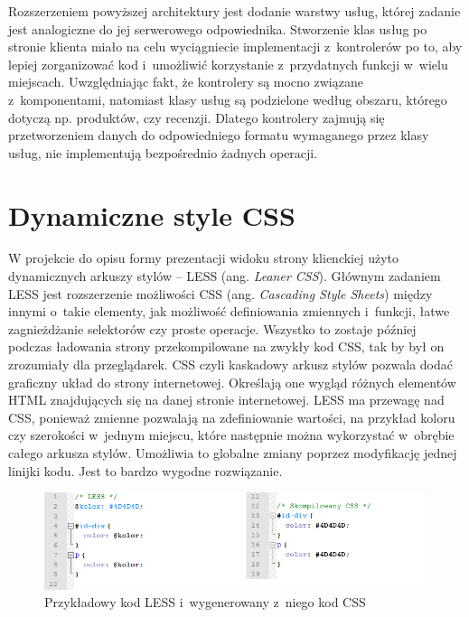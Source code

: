 Rozszerzeniem powyższej architektury jest dodanie warstwy usług, której zadanie jest analogiczne do jej serwerowego odpowiednika. Stworzenie klas usług po stronie klienta miało na celu wyciągniecie implementacji z~kontrolerów po to, aby lepiej zorganizować kod i~umożliwić korzystanie z~przydatnych funkcji w~wielu miejscach. Uwzględniając fakt, że kontrolery są mocno związane z~komponentami, natomiast klasy usług są podzielone według obszaru, którego dotyczą np. produktów, czy recenzji. Dlatego kontrolery zajmują się przetworzeniem danych do odpowiedniego formatu wymaganego przez klasy usług, nie implementują bezpośrednio żadnych operacji.



\section{Dynamiczne style CSS}
W projekcie do opisu formy prezentacji widoku strony klienckiej użyto dynamicznych arkuszy stylów – LESS (ang. \textit{Leaner CSS}). Głównym zadaniem LESS jest rozszerzenie możliwości CSS (ang. \textit{Cascading Style Sheets}) między innymi o~takie elementy, jak możliwość definiowania zmiennych i~funkcji, łatwe zagnieżdżanie selektorów czy proste operacje. Wszystko to zostaje później podczas ładowania strony przekompilowane na zwykły kod CSS, tak by był on zrozumiały dla przeglądarek. CSS czyli kaskadowy arkusz stylów pozwala dodać graficzny układ do strony internetowej. Określają one wygląd różnych elementów HTML znajdujących się na danej stronie internetowej. 
LESS ma przewagę nad CSS, ponieważ zmienne pozwalają na zdefiniowanie wartości, na przykład koloru czy szerokości w~jednym miejscu, które następnie można wykorzystać w~obrębie całego arkusza stylów. Umożliwia to globalne zmiany poprzez modyfikację jednej linijki kodu. Jest to bardzo wygodne rozwiązanie. 

\begin{figure}[h]
	\centering
	\includegraphics[width=1.00\textwidth]{images/less1.png}
	\caption{Przykładowy kod LESS i~wygenerowany z~niego kod CSS}
\end{figure}
